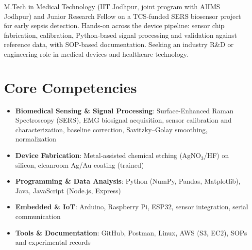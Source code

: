\documentclass[11pt,a4paper,sans]{moderncv}
\begin{document}
\makecvtitle


\vspace{6pt}
\small{M.Tech in Medical Technology (IIT Jodhpur, joint program with AIIMS Jodhpur) and Junior Research Fellow on a TCS-funded SERS biosensor project for early sepsis detection. Hands-on across the device pipeline: sensor chip fabrication, calibration, Python-based signal processing and validation against reference data, with SOP-based documentation. Seeking an industry R\&D or engineering role in medical devices and healthcare technology.}


\section{Core Competencies}
\vspace{1pt}
\begin{itemize}

\item \textbf{Biomedical Sensing \& Signal Processing}: Surface-Enhanced Raman Spectroscopy (SERS), EMG biosignal acquisition, sensor calibration and characterization, baseline correction, Savitzky--Golay smoothing, normalization

\item \textbf{Device Fabrication}: Metal-assisted chemical etching (AgNO$_3$/HF) on silicon, cleanroom Ag/Au coating (trained)

\item \textbf{Programming \& Data Analysis}: Python (NumPy, Pandas, Matplotlib), Java, JavaScript (Node.js, Express)

\item \textbf{Embedded \& IoT}: Arduino, Raspberry Pi, ESP32, sensor integration, serial communication

\item \textbf{Tools \& Documentation}: GitHub, Postman, Linux, AWS (S3, EC2), SOPs and experimental records

\end{itemize}

\end{document}
